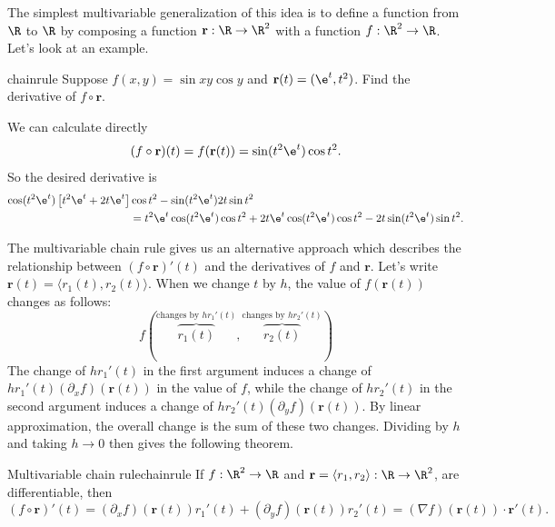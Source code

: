 \documentclass{watsonbook}
\begin{document}
The simplest multivariable generalization of this idea is to define a
function from $\R$ to $\R$ by composing a function $\mathbf{r}: \R
\to \R^2$
with a function $f: \R^2 \to \R$. Let's look at an example.

\begin{example}{}{chainrule}
  Suppose $f(x,y) = \sin xy \cos y$ and $\mathbf{r}(t) = (\e^t,
  t^2)$. Find the derivative of $f \circ \mathbf{r}$. 
\end{example}

\begin{solution}
  We can calculate directly
  \[
    (f \circ \mathbf{r})(t) = f(\mathbf{r}(t)) = \sin (t^2\e^t) \cos
    t^2. 
  \]
  So the desired derivative is
  \begin{align*}
    \cos(t^2\e^t)\left[ t^2 \e^t + 2t\e^t\right] &\cos t^2  -
     \sin(t^2 \e^t) 2t \sin t^2  \\
    &=t^2 \e^t \cos(t^2 \e^t) \cos t^2 + 2t\e^t \cos(t^2 \e^t) \cos t^2 -
                           2t \sin(t^2 \e^t) \sin t^2. 
  \end{align*}
\end{solution}

The multivariable chain rule gives us an alternative approach which
describes the relationship between $(f\circ \mathbf{r})'(t)$ and the
derivatives of $f$ and $\mathbf{r}$. Let's write
$\mathbf{r}(t) = \langle r_1(t), r_2(t) \rangle$.  When we change
$t$ by $h$, the value of $f(\mathbf{r}(t))$ changes as follows: 
\[
  f\left(
    \overbrace{r_1(t)}^{\text{changes by $hr_1'(t)$}},
    \overbrace{r_2(t)}^{\text{changes by $hr_2'(t)$}}
  \right)
\]
The change of $hr_1'(t)$ in the first argument induces a change of
$hr_1'(t) (\partial_xf)(\mathbf{r}(t))$ in the value of $f$, while
the change of $hr_2'(t)$ in the second argument induces a change of
$hr_2'(t) (\partial_yf)(\mathbf{r}(t))$. By linear approximation,
the overall change is the sum of these two changes. Dividing by $h$
and taking $h \to 0$ then gives the following theorem.

\begin{theo}{Multivariable chain rule}{chainrule}
  If $f : \R^2 \to \R$ and $\mathbf{r} = \langle r_1,  r_2\rangle :
  \R \to \R^2$,
  are differentiable, then
  \begin{equation} \label{eq:chainrule} 
    (f\circ \mathbf{r})'(t) = (\partial_x f)(\mathbf{r}(t))r_1'(t) +
    (\partial_y f)(\mathbf{r}(t))r_2'(t) = (\nabla f)(\mathbf{r}(t))
    \cdot \mathbf{r}'(t). 
  \end{equation}
\end{theo}
\end{document}
